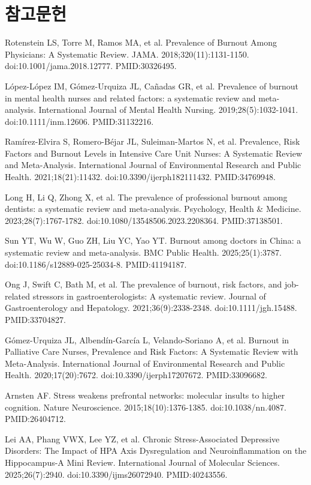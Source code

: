 \documentclass[12pt,oneside]{book}
\newcommand{\refstart}{\par\begingroup\fontsize{8.5pt}{10.2pt}\selectfont\setlength{\parskip}{1.4pt}\raggedright}
\newcommand{\reff}[2]{\par\hangindent=7mm\hangafter=1\noindent[#1]\hspace{2mm}#2\par}
\begin{document}
\section*{참고문헌}

\refstart

\reff{1}{Rotenstein LS, Torre M, Ramos MA, et al. Prevalence of Burnout Among Physicians: A Systematic Review. JAMA. 2018;320(11):1131-1150. doi:10.1001/jama.2018.12777. PMID:30326495.}

\reff{2}{López-López IM, Gómez-Urquiza JL, Cañadas GR, et al. Prevalence of burnout in mental health nurses and related factors: a systematic review and meta-analysis. International Journal of Mental Health Nursing. 2019;28(5):1032-1041. doi:10.1111/inm.12606. PMID:31132216.}

\reff{3}{Ramírez-Elvira S, Romero-Béjar JL, Suleiman-Martos N, et al. Prevalence, Risk Factors and Burnout Levels in Intensive Care Unit Nurses: A Systematic Review and Meta-Analysis. International Journal of Environmental Research and Public Health. 2021;18(21):11432. doi:10.3390/ijerph182111432. PMID:34769948.}

\reff{4}{Long H, Li Q, Zhong X, et al. The prevalence of professional burnout among dentists: a systematic review and meta-analysis. Psychology, Health \& Medicine. 2023;28(7):1767-1782. doi:10.1080/13548506.2023.2208364. PMID:37138501.}

\reff{5}{Sun YT, Wu W, Guo ZH, Liu YC, Yao YT. Burnout among doctors in China: a systematic review and meta-analysis. BMC Public Health. 2025;25(1):3787. doi:10.1186/s12889-025-25034-8. PMID:41194187.}

\reff{6}{Ong J, Swift C, Bath M, et al. The prevalence of burnout, risk factors, and job-related stressors in gastroenterologists: A systematic review. Journal of Gastroenterology and Hepatology. 2021;36(9):2338-2348. doi:10.1111/jgh.15488. PMID:33704827.}

\reff{7}{Gómez-Urquiza JL, Albendín-García L, Velando-Soriano A, et al. Burnout in Palliative Care Nurses, Prevalence and Risk Factors: A Systematic Review with Meta-Analysis. International Journal of Environmental Research and Public Health. 2020;17(20):7672. doi:10.3390/ijerph17207672. PMID:33096682.}

\reff{8}{Arnsten AF. Stress weakens prefrontal networks: molecular insults to higher cognition. Nature Neuroscience. 2015;18(10):1376-1385. doi:10.1038/nn.4087. PMID:26404712.}

\reff{9}{Lei AA, Phang VWX, Lee YZ, et al. Chronic Stress-Associated Depressive Disorders: The Impact of HPA Axis Dysregulation and Neuroinflammation on the Hippocampus-A Mini Review. International Journal of Molecular Sciences. 2025;26(7):2940. doi:10.3390/ijms26072940. PMID:40243556.}
\end{document}
